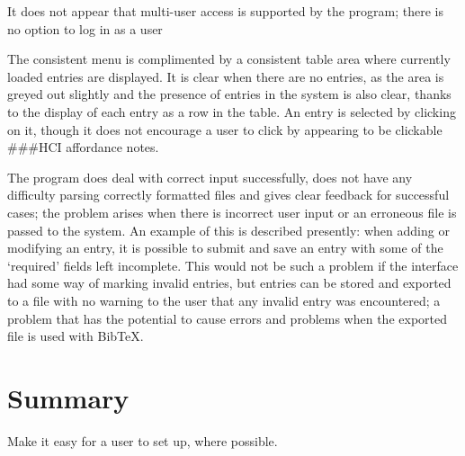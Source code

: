 \documentclass{l4proj}
\newcommand{\BibTeX}{B{\sc ib}\TeX}
\newcommand{\bibtex}{\BibTeX}
\newcommand{\revisit}{\#\#\#}
\begin{document}
It does not appear that multi-user access is supported by the program; there is no option to log in as a user

The consistent menu is complimented by a consistent table area where currently loaded entries are displayed.  It is clear when there are no entries, as the area is greyed out slightly and the presence of entries in the system is also clear, thanks to the display of each entry as a row in the table.  An entry is selected by clicking on it, though it does not encourage a user to click by appearing to be clickable  \revisit HCI affordance notes.

The program does deal with correct input successfully, does not have any difficulty parsing correctly formatted files and gives clear feedback for successful cases; the problem arises when there is incorrect user input or an erroneous file is passed to the system.  An example of this is described presently: when adding or modifying an entry, it is possible to submit and save an entry with some of the `required' fields left incomplete.  This would not be such a problem if the interface had some way of marking invalid entries, but entries can be stored and exported to a file with no warning to the user that any invalid entry was encountered; a problem that has the potential to cause errors and problems when the exported file is used with \bibtex{}.









\section{Summary}
Make it easy for a user to set up, where possible.
\end{document}
